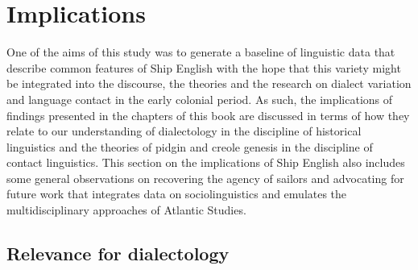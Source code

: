 \section{{Implications}}%

  One of the aims of this study was to generate a baseline of linguistic data that describe common features of Ship English with the hope that this variety might be integrated into the discourse, the theories and the research on dialect variation and language contact in the early colonial period. As such, the implications of findings presented in the chapters of this book are discussed in terms of how they relate to our understanding of dialectology in the discipline of historical linguistics and the theories of pidgin and creole genesis in the discipline of contact linguistics. This section on the implications of Ship English also includes some general observations on recovering the agency of sailors and advocating for future work that integrates data on sociolinguistics and emulates the multidisciplinary approaches of Atlantic Studies.

\subsection{{Relevance} {for} {dialectology}}%

